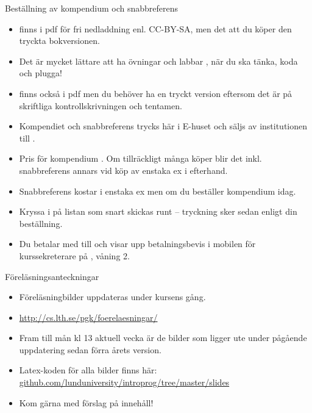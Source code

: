 \else


\begin{SlideExtra}{Beställning av kompendium och snabbreferens}\SlideFontSmall
\begin{itemize}

\item {} finns i pdf för fri nedladdning enl. CC-BY-SA, men det  att du köper den tryckta bokversionen.

\item Det är mycket lättare att ha övningar och labbar  , när du ska tänka, koda och plugga!

\item {} finns också i pdf men du behöver ha en tryckt version eftersom det är  på skriftliga kontrollskrivningen och tentamen.

\item Kompendiet och snabbreferens trycks här i E-huset och säljs av institutionen till .

\item Pris för kompendium . Om tillräckligt många köper blir det  inkl. snabbreferens annars  vid köp av enstaka ex i efterhand.

\item Snabbreferens kostar  i enstaka ex men  om du beställer kompendium idag.

\item Kryssa i  på listan som snart skickas runt -- tryckning sker sedan enligt din beställning.

\item Du betalar med  till  och visar upp betalningsbevis i mobilen för kurssekreterare på , våning 2.

\end{itemize}
\end{SlideExtra}

\begin{SlideExtra}{Föreläsningsanteckningar}
\begin{itemize}
\item Föreläsningbilder uppdateras under kursens gång.
\item \url{http://cs.lth.se/pgk/foerelaesningar/}
\item Fram till mån kl 13 aktuell vecka är de bilder som ligger ute under pågående uppdatering sedan förra årets version.
\item Latex-koden för alla bilder finns här: \\
\href{https://github.com/lunduniversity/introprog/tree/master/slides}{github.com/lunduniversity/introprog/tree/master/slides}
\item Kom gärna med förslag på innehåll!
\end{itemize}
\end{SlideExtra}
\fi


